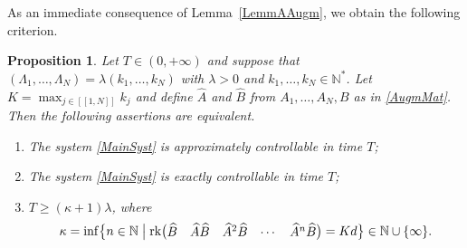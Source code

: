 \documentclass[10pt]{amsart}
\newcommand{\llbracket}{[\![}
\newcommand{\rrbracket}{]\!]}
\theoremstyle{plain}
\newtheorem{prop}[theo]{Proposition}
\theoremstyle{definition}
\DeclareMathOperator{\rank}{rk}
\begin{document}
As an immediate consequence of Lemma~\ref{LemmAAugm}, we obtain the following criterion.

\begin{prop}
\label{PropCommensurable}
Let $T \in (0, +\infty)$ and suppose that $(\Lambda_1, \dots, \Lambda_N) = \lambda (k_1, \dots, k_N)$ with $\lambda > 0$ and $k_1, \dots, k_N \in \mathbb N^\ast$. Let $K = \max_{j \in \llbracket 1, N\rrbracket} k_j$ and define $\widehat A$ and $\widehat B$ from $A_1, \dots, A_N, B$ as in \eqref{AugmMat}. Then the following assertions are equivalent.
\begin{enumerate}
\item\label{CtrlCommensurableApprox} The system \eqref{MainSyst} is approximately controllable in time $T$;
\item\label{CtrlCommensurableExact} The system \eqref{MainSyst} is exactly controllable in time $T$;
\item\label{CtrlCommensurableKalman} $T \geq (\kappa+1) \lambda$, where
\[
\kappa = \inf\bigl\{n \in \mathbb N \bigm| \rank\bigl(\begin{matrix}\widehat B & \widehat A \widehat B & \widehat A^2 \widehat B & \cdots & \widehat A^n \widehat B\end{matrix}\bigr) = K d\bigr\} \in \mathbb N \cup \{\infty\}.
\]
\end{enumerate}
\end{prop}
\end{document}
